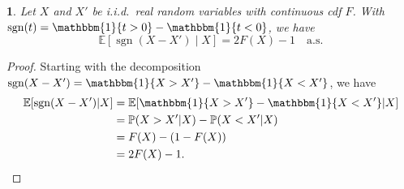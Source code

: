 \documentclass[11pt]{article}
\theoremstyle{plain}
\theoremstyle{plain}
\theoremstyle{plain}
\theoremstyle{plain}
\theoremstyle{plain}
\theoremstyle{plain}
\theoremstyle{plain}
\newtheorem{lemma}{\protect\lemmaname}
\providecommand{\lemmaname}{Lemma}
\begin{document}
\begin{lemma}
Let $X$ and $X'$ be i.i.d.\ real random variables with continuous cdf $F$. With
$\operatorname{sgn}(t)=\mathbbm{1}\{t>0\}-\mathbbm{1}\{t<0\}$, we have
\[
\mathbb{E}\!\left[\operatorname{sgn}(X-X')\mid X\right]=2F(X)-1 \quad \text{a.s.}
\]
\end{lemma}

\begin{proof}
Starting with the decomposition $\operatorname{sgn}(X-X')=\mathbbm{1}\{X>X'\}-\mathbbm{1}\{X<X'\}$, we have
\begin{align*}
    \mathbb{E}[\operatorname{sgn}(X-X')|X] &= \mathbb{E}[\mathbbm{1}\{X>X'\}-\mathbbm{1}\{X<X'\}| X] \\
    &= \mathbb{P}(X>X'|X)-\mathbb{P}(X<X'| X) \\
    &= F(X) - (1-F(X)) \\
    &= 2F(X) - 1 . \qedhere
\end{align*}
\end{proof}
\end{document}
